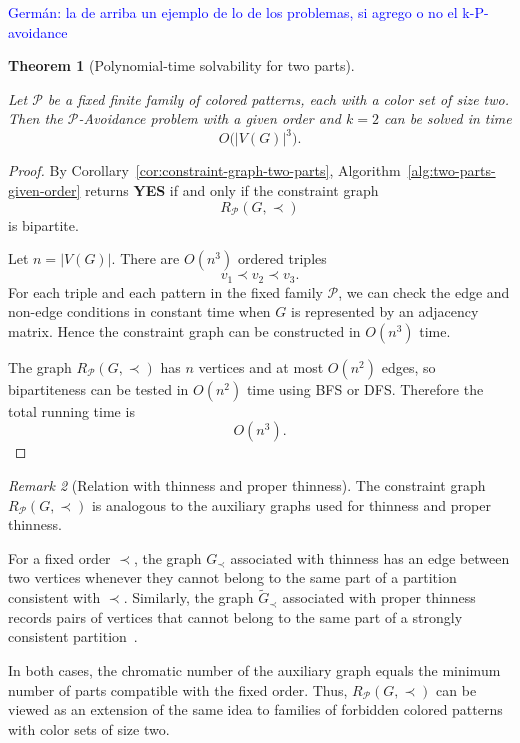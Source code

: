 \documentclass[12pt]{article}
\theoremstyle{plain}
\newtheorem{theorem}{Theorem}[section]
\theoremstyle{definition}
\theoremstyle{remark}
\newtheorem{remark}[theorem]{Remark}
\theoremstyle{definition}
\newcommand{\german}[1]{%
  \textcolor{blue}{Germán: #1}%
}
\begin{document}
\german{la de arriba un ejemplo de lo de los problemas, si agrego o no el k-P-avoidance}

\begin{theorem}[Polynomial-time solvability for two parts]
\label{thm:given-order-two-parts-polynomial}

Let \(\mathcal P\) be a fixed finite family of colored patterns, each with a
color set of size two. Then the \(\mathcal P\)-Avoidance problem with a given
order and \(k=2\) can be solved in time
\[
O\bigl(|V(G)|^3\bigr).
\]
\end{theorem}



\begin{proof}
By Corollary~\ref{cor:constraint-graph-two-parts},
Algorithm~\ref{alg:two-parts-given-order} returns \textbf{YES} if and only if
the constraint graph
\[
R_{\mathcal P}(G,\prec)
\]
is bipartite.

Let \(n=|V(G)|\). There are \(O(n^3)\) ordered triples
\[
v_1\prec v_2\prec v_3.
\]
For each triple and each pattern in the fixed family \(\mathcal P\), we can
check the edge and non-edge conditions in constant time when \(G\) is
represented by an adjacency matrix. Hence the constraint graph can be
constructed in \(O(n^3)\) time.

The graph \(R_{\mathcal P}(G,\prec)\) has \(n\) vertices and at most
\(O(n^2)\) edges, so bipartiteness can be tested in \(O(n^2)\) time using
BFS or DFS. Therefore the total running time is
\[
O(n^3).
\]
\end{proof}



\begin{remark}[Relation with thinness and proper thinness]
The constraint graph \(R_{\mathcal P}(G,\prec)\) is analogous to the auxiliary
graphs used for thinness and proper thinness.

For a fixed order \(\prec\), the graph \(G_{\prec}\) associated with thinness
has an edge between two vertices whenever they cannot belong to the same part
of a partition consistent with \(\prec\). Similarly, the graph
\(\widetilde{G}_{\prec}\) associated with proper thinness records pairs of
vertices that cannot belong to the same part of a strongly consistent
partition~\cite{BonomoDeEstrada2019}.

In both cases, the chromatic number of the auxiliary graph equals the minimum
number of parts compatible with the fixed order. Thus,
\(R_{\mathcal P}(G,\prec)\) can be viewed as an extension of the same idea to
families of forbidden colored patterns with color sets of size two.
\end{remark}
\end{document}
